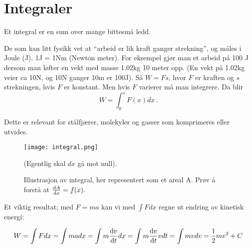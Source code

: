 \documentclass[11pt, A4paper]{article}
\begin{document}
\newpage
\section{Integraler}
Et integral er en sum over mange bittesmå ledd.

De som kan litt fysikk vet at ``arbeid er lik kraft ganger strekning'', og måles i Joule (J). 1J = 1Nm (Newton meter). For eksempel gjør man et arbeid på 100 J dersom man løfter en vekt med masse 1.02kg 10 meter opp. (En vekt på 1.02kg veier ca 10N, og 10N ganger 10m er 100J). Så $W=Fs$, hvor $F$ er kraften og $s$ strekningen, hvis $F$ er konstant. Men hvis $F$ varierer må man integrere. Da blir 
\begin{equation}
\label{eq:17}
W=\int_0^s F(x) dx\,.
\end{equation}

Dette er relevant for stålfjærer, molekyler og gasser som komprimeres eller utvides.



\begin{figure}[h]
  \centerline{\texttt{[image: integral.png]}}
  \caption{Illustrasjon av integral, her representert som et areal A. Prøv å forstå at $\dv{A}{x} = f(x).$} (Egentlig skal $dx$ gå mot null).
  \label{fig:interp_example}
\end{figure}

  

Et viktig resultat; med $F=ma$ kan vi med $\int Fdx$ regne ut endring av kinetisk energi: 

\begin{equation}
\label{eq:18}
W = \int F dx = \int ma dx = \int m \dv{v}{t} dx =\int m \dv{v}{t} v dt = \int m v dv = \frac{1}{2} m v^2 + C
\end{equation}
\end{document}
